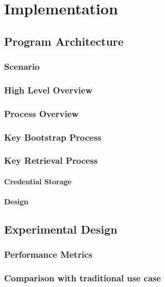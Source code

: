 \chapter{Implementation}\label{C:implementation}

\section{Program Architecture}
	\subsection{Scenario}

	\subsection{High Level Overview}

	\subsection{Process Overview}
		\subsection{Key Bootstrap Process}
		
		\subsection{Key Retrieval Process}

		\subsubsection{Credential Storage}

	\subsubsection{Design}

\section{Experimental Design}
	\subsection{Performance Metrics}

	\subsection{Comparison with traditional use case}